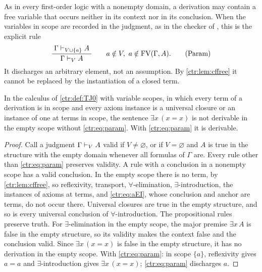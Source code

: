 As in every first-order logic with a nonempty domain, a derivation may contain a free
variable that occurs neither in its context nor in its conclusion. When the variables in
scope are recorded in the judgment, as in the checker of , this is the
explicit rule
\begin{equation}\label{ctr:eq:param}
 \dfrac{\;\Gamma\vdash_{V\cup\{a\}}A\;}{\;\Gamma\vdash_V A\;}
 \qquad a\notin V,\ a\notin\operatorname{FV}(\Gamma,A).
 \tag{Param}
\end{equation}
It discharges an arbitrary element, not an assumption. By \cref{ctr:lem:cffree} it cannot be
replaced by the instantiation of a closed term.

\begin{proposition}\label{ctr:prop:cfparam}
In the calculus of \cref{ctr:def:TJ0} with variable scopes, in which every term of a
derivation is in scope and every axiom instance is a universal closure or an instance of one
at terms in scope, the sentence $\exists x\,(x=x)$ is not derivable in the empty scope
without \eqref{ctr:eq:param}. With \eqref{ctr:eq:param} it is derivable.
\end{proposition}
\begin{proof}
Call a judgment $\Gamma\vdash_V A$ valid if $V\neq\varnothing$, or if $V=\varnothing$ and
$A$ is true in the structure with the empty domain whenever all formulas of $\Gamma$ are.
Every rule other than \eqref{ctr:eq:param} preserves validity. A rule with a conclusion in a
nonempty scope has a valid conclusion. In the empty scope there is no term, by
\cref{ctr:lem:cffree}, so reflexivity, transport, $\forall$-elimination,
$\exists$-introduction, the instances of axioms at terms, and \eqref{ctr:eq:aEI}, whose
conclusion and anchor are terms, do not occur there. Universal closures are true in the
empty structure, and so is every universal conclusion of $\forall$-introduction. The
propositional rules preserve truth. For $\exists$-elimination in the empty scope, the
major premise $\exists x\,A$ is false in the empty structure, so its validity makes the
context false and the conclusion valid. Since $\exists x\,(x=x)$ is false in the empty
structure, it has no derivation in the empty scope. With \eqref{ctr:eq:param}: in scope
$\{a\}$, reflexivity gives $a=a$ and $\exists$-introduction gives $\exists x\,(x=x)$;
\eqref{ctr:eq:param} discharges $a$.
\end{proof}

